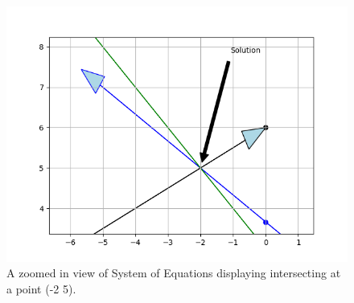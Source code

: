 \\
\begin{figure}
	\includegraphics[width=\linewidth]{./solutions/line_plane/17/assignment1solution_graph.png}
  \caption{A zoomed in view of System of Equations displaying intersecting at a point (-2 5).}
  \label{eq:solutions/line_plane/17fig:graph2}
\end{figure}
